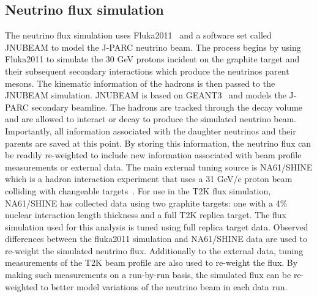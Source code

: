 \subsection{Neutrino flux simulation}
\label{subsec:NeutrinoFluxSimulation}
The neutrino flux simulation uses Fluka2011~\cite{Ferrari_fluka:a} and a software set called JNUBEAM to model the J-PARC neutrino beam.  The process begins by using Fluka2011 to simulate the 30 GeV protons incident on the graphite target and their subsequent secondary interactions which produce the neutrinos parent mesons.  The kinematic information of the hadrons is then passed to the JNUBEAM simulation.  JNUBEAM is based on GEANT3~\cite{Brun:1987ma} and models the J-PARC secondary beamline.  The hadrons are tracked through the decay volume and are allowed to interact or decay to produce the simulated neutrino beam.  Importantly, all information associated with the daughter neutrinos and their parents are saved at this point.  By storing this information, the neutrino flux can be readily re-weighted to include new information associated with beam profile measurements or external data.
\newline
\newline
The main external tuning source is NA61/SHINE which is a hadron interaction experiment that uses a 31 GeV/c proton beam colliding with changeable targets~\cite{PhysRevC.84.034604}.  For use in the T2K flux simulation, NA61/SHINE has collected data using two graphite targets: one with a 4$\%$ nuclear interaction length thickness and a full T2K replica target.  The flux simulation used for this analysis is tuned using full replica target data.  Observed differences between the fluka2011 simulation and NA61/SHINE data are used to re-weight the simulated neutrino flux.
\newline
\newline
Additionally to the external data, tuning measurements of the T2K beam profile are also used to re-weight the flux.  By making such measurements on a run-by-run basis, the simulated flux can be re-weighted to better model variations of the neutrino beam in each data run.
